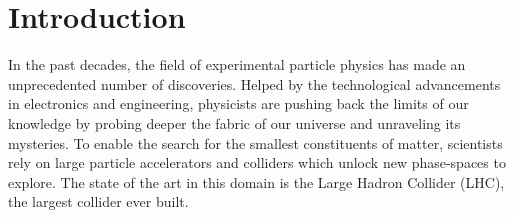 \chapter*{Introduction}
\label{chap:0-4-introduction}

  In the past decades, the field of experimental particle physics has made an unprecedented number of discoveries. Helped by the technological advancements in electronics and engineering, physicists are pushing back the limits of our knowledge by probing deeper the fabric of our universe and unraveling its mysteries. To enable the search for the smallest constituents of matter, scientists rely on large particle accelerators and colliders which unlock new phase-spaces to explore. The state of the art in this domain is the Large Hadron Collider (LHC), the largest collider ever built.   
